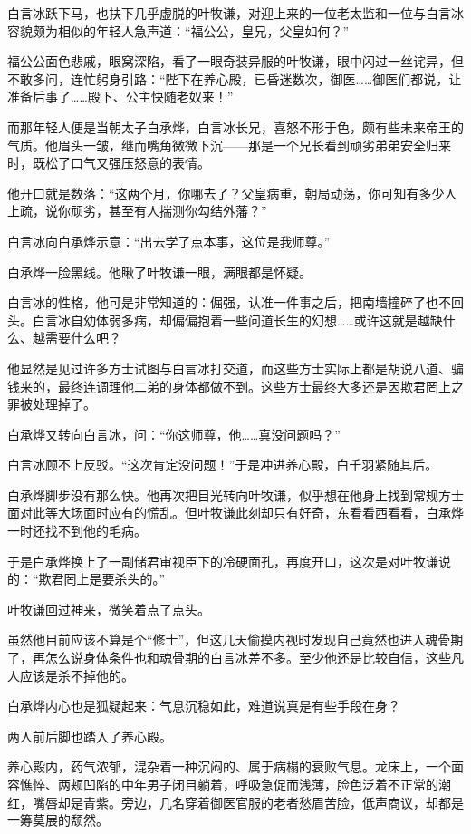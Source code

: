 白言冰跃下马，也扶下几乎虚脱的叶牧谦，对迎上来的一位老太监和一位与白言冰容貌颇为相似的年轻人急声道：“福公公，皇兄，父皇如何？”

福公公面色悲戚，眼窝深陷，看了一眼奇装异服的叶牧谦，眼中闪过一丝诧异，但不敢多问，连忙躬身引路：“陛下在养心殿，已昏迷数次，御医……御医们都说，让准备后事了……殿下、公主快随老奴来！”

而那年轻人便是当朝太子白承烨，白言冰长兄，喜怒不形于色，颇有些未来帝王的气质。他眉头一皱，继而嘴角微微下沉——那是一个兄长看到顽劣弟弟安全归来时，既松了口气又强压怒意的表情。

他开口就是数落：“这两个月，你哪去了？父皇病重，朝局动荡，你可知有多少人上疏，说你顽劣，甚至有人揣测你勾结外藩？”

白言冰向白承烨示意：“出去学了点本事，这位是我师尊。”

白承烨一脸黑线。他瞅了叶牧谦一眼，满眼都是怀疑。

白言冰的性格，他可是非常知道的：倔强，认准一件事之后，把南墙撞碎了也不回头。白言冰自幼体弱多病，却偏偏抱着一些问道长生的幻想……或许这就是越缺什么、越需要什么吧？

他显然是见过许多方士试图与白言冰打交道，而这些方士实际上都是胡说八道、骗钱来的，最终连调理他二弟的身体都做不到。这些方士最终大多还是因欺君罔上之罪被处理掉了。

白承烨又转向白言冰，问：“你这师尊，他……真没问题吗？”

白言冰顾不上反驳。“这次肯定没问题！”于是冲进养心殿，白千羽紧随其后。

白承烨脚步没有那么快。他再次把目光转向叶牧谦，似乎想在他身上找到常规方士面对此等大场面时应有的慌乱。但叶牧谦此刻却只有好奇，东看看西看看，白承烨一时还找不到他的毛病。

于是白承烨换上了一副储君审视臣下的冷硬面孔，再度开口，这次是对叶牧谦说的：“欺君罔上是要杀头的。”

叶牧谦回过神来，微笑着点了点头。

虽然他目前应该不算是个“修士”，但这几天偷摸内视时发现自己竟然也进入魂骨期了，再怎么说身体条件也和魂骨期的白言冰差不多。至少他还是比较自信，这些凡人应该是杀不掉他的。

白承烨内心也是狐疑起来：气息沉稳如此，难道说真是有些手段在身？

两人前后脚也踏入了养心殿。

养心殿内，药气浓郁，混杂着一种沉闷的、属于病榻的衰败气息。龙床上，一个面容憔悴、两颊凹陷的中年男子闭目躺着，呼吸急促而浅薄，脸色泛着不正常的潮红，嘴唇却是青紫。旁边，几名穿着御医官服的老者愁眉苦脸，低声商议，却都是一筹莫展的颓然。

